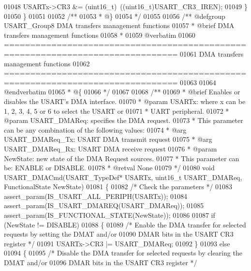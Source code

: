 \begin{DoxyCode}
01048     USARTx->CR3 &= (uint16\_t)~((uint16\_t)USART_CR3_IREN);
01049   \}
01050 \}
01051 
01052 \textcolor{comment}{/**}
01053 \textcolor{comment}{  * @\}}
01054 \textcolor{comment}{  */}
01055 
01056 \textcolor{comment}{/** @defgroup USART\_Group8 DMA transfers management functions}
01057 \textcolor{comment}{ *  @brief   DMA transfers management functions}
01058 \textcolor{comment}{ *}
01059 \textcolor{comment}{@verbatim   }
01060 \textcolor{comment}{ ===============================================================================}
01061 \textcolor{comment}{                      DMA transfers management functions}
01062 \textcolor{comment}{ ===============================================================================  }
01063 \textcolor{comment}{}
01064 \textcolor{comment}{@endverbatim}
01065 \textcolor{comment}{  * @\{}
01066 \textcolor{comment}{  */}
01067 
01068 \textcolor{comment}{/**}
01069 \textcolor{comment}{  * @brief  Enables or disables the USART's DMA interface.}
01070 \textcolor{comment}{  * @param  USARTx: where x can be 1, 2, 3, 4, 5 or 6 to select the USART or }
01071 \textcolor{comment}{  *         UART peripheral.}
01072 \textcolor{comment}{  * @param  USART\_DMAReq: specifies the DMA request.}
01073 \textcolor{comment}{  *          This parameter can be any combination of the following values:}
01074 \textcolor{comment}{  *            @arg USART\_DMAReq\_Tx: USART DMA transmit request}
01075 \textcolor{comment}{  *            @arg USART\_DMAReq\_Rx: USART DMA receive request}
01076 \textcolor{comment}{  * @param  NewState: new state of the DMA Request sources.}
01077 \textcolor{comment}{  *          This parameter can be: ENABLE or DISABLE.   }
01078 \textcolor{comment}{  * @retval None}
01079 \textcolor{comment}{  */}
01080 \textcolor{keywordtype}{void} USART_DMACmd(USART\_TypeDef* USARTx, uint16\_t USART\_DMAReq, FunctionalState NewState)
01081 \{
01082   \textcolor{comment}{/* Check the parameters */}
01083   assert_param(IS\_USART\_ALL\_PERIPH(USARTx));
01084   assert_param(IS\_USART\_DMAREQ(USART\_DMAReq));
01085   assert_param(IS\_FUNCTIONAL\_STATE(NewState));
01086 
01087   \textcolor{keywordflow}{if} (NewState != DISABLE)
01088   \{
01089     \textcolor{comment}{/* Enable the DMA transfer for selected requests by setting the DMAT and/or}
01090 \textcolor{comment}{       DMAR bits in the USART CR3 register */}
01091     USARTx->CR3 |= USART\_DMAReq;
01092   \}
01093   \textcolor{keywordflow}{else}
01094   \{
01095     \textcolor{comment}{/* Disable the DMA transfer for selected requests by clearing the DMAT and/or}
01096 \textcolor{comment}{       DMAR bits in the USART CR3 register */}

\end{DoxyCode}

